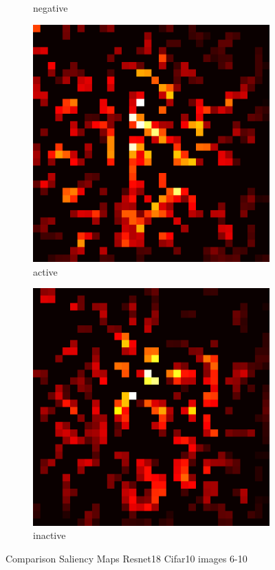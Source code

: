 \documentclass[preprint,12pt]{elsarticle}
\begin{document}
\begin{figure}
\begin{subfigure}{0.14\textwidth}
        \caption{negative}
    \end{subfigure}
    \hfill
    \begin{subfigure}{0.14\textwidth}
        \centering
        \includegraphics[width=\linewidth]{../visualizations/examples/cifar10/resnet18/active_saliency_map/9.png}
        \caption{active}
    \end{subfigure}
    \hfill
    \begin{subfigure}{0.14\textwidth}
        \centering
        \includegraphics[width=\linewidth]{../visualizations/examples/cifar10/resnet18/inactive_saliency_map/9.png}
        \caption{inactive}
    \end{subfigure}
    \hfill
    \caption{Comparison Saliency Maps Resnet18 Cifar10 images 6-10}
\end{figure}
\end{document}
